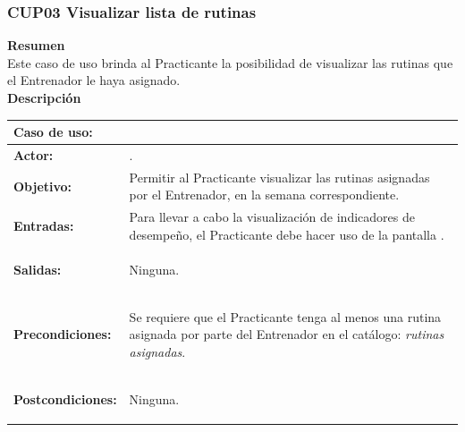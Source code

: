 \subsubsection{CUP03 Visualizar lista de rutinas}
\label{cu:CUP03}

\textbf{\textcolor[rgb]{0, 0, 0.545098}{Resumen}} \\

Este caso de uso brinda al Practicante la posibilidad de visualizar las rutinas que el Entrenador le haya asignado.\\

\textbf{\textcolor[rgb]{0, 0, 0.545098}{Descripción}}

\begin{table}[H]
\centering
\begin{tabular}{| l | p{12 cm} |}
\hline
\rowcolor[rgb]{0.529412, 0.807843, 0.980392} {\textbf{Caso de uso:}} & \hspace{7em}{\textbf{CUP03 Visualizar lista de rutinas}}\\
\hline
\textbf{Actor:} &  \nameref{act:Practicante}. \\
\hline
\textbf{Objetivo:} & Permitir al Practicante visualizar las rutinas asignadas por el Entrenador, en la semana correspondiente.\\
\hline
\textbf{Entradas:} & Para llevar a cabo la visualización de indicadores de desempeño, el Practicante debe hacer uso de la pantalla \nameref{pant:IUP03}. \\
\hline
\textbf{Salidas:} &	\vspace{-2mm}	%
					\begin{compactitem}
					\setlength\itemsep{-0.25em}
						\item Ninguna.
					\end{compactitem}\\
\hline
\textbf{Precondiciones:} & 	\vspace{-2mm}	%
							\begin{compactitem}
							\setlength\itemsep{-0.25em}
								\item Se requiere que el Practicante tenga al menos una rutina asignada por parte del Entrenador en el catálogo: \textit{rutinas asignadas}.
							\end{compactitem}\\
\hline
\textbf{Postcondiciones:} & \vspace{-2mm}	%
							\begin{compactitem}
								\item Ninguna.
							\end{compactitem}\\
							

\end{tabular}
\end{table}

